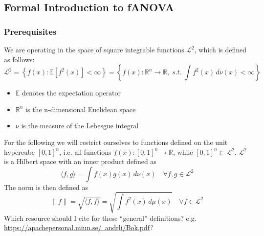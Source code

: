 

\subsection{Formal Introduction to fANOVA}
\subsubsection*{Prerequisites}
We are operating in the space of square integrable functions $\mathcal{L}^2$, which is defined as follows:
\[
\mathcal{L}^2 = \left\{ f(x) : \mathbb{E}[f^2(x)] < \infty \right\}
= \left\{ f(x) : \mathbb{R}^{n} \to \mathbb{R}, \; \textit{s.t.} \; \int f^2(x)\, d\nu(x) < \infty \right\}
\]
\begin{itemize}
    \item $\mathbb{E}$ denotes the expectation operator
    \item $\mathbb{R}^{n}$ is the n-dimensional Euclidean space
    \item $\nu$ is the measure of the Lebesgue integral
\end{itemize}
For the following we will restrict ourselves to functions defined on the unit hypercube $[0,1]^n$, i.e. all functions $f(x): [0,1]^n \rightarrow \mathbb{R}$, while $[0,1]^n \subset \mathcal{L}^2$. $\mathcal{L}^2$ is a Hilbert space with an inner product defined as
\[
\langle f, g \rangle = \int f(x) g(x) \, d\nu(x) \quad \forall f, g \in \mathcal{L}^2
\]
The norm is then defined as
\[
\|f\| = \sqrt{\langle f, f \rangle} = \sqrt{\int f^2(x) \, d\mu(x)} \quad \forall f \in \mathcal{L}^2
\]
{\color{blue} Which resource should I cite for these ``general'' definitions? e.g. \href{https://apachepersonal.miun.se/~andrli/Bok.pdf}{https://apachepersonal.miun.se/~andrli/Bok.pdf}?}

